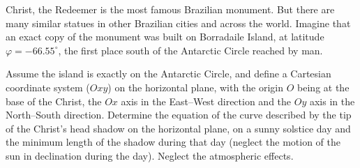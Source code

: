 Christ, the Redeemer is the most famous Brazilian monument. But there are many
similar statues in other Brazilian cities and across the world. Imagine that
an exact copy of the monument was built on Borradaile Island, at latitude
$\varphi = -66.55^\circ$, the first place south of the Antarctic Circle
reached by man.

Assume the island is exactly on the Antarctic Circle, and define a Cartesian
coordinate system ($Oxy$) on the horizontal plane, with the origin $O$ being
at the base of the Christ, the $Ox$ axis in the East--West direction and the
$Oy$ axis in the North--South direction. Determine the equation of the curve
described by the tip of the Christ's head shadow on the horizontal plane, on a
sunny solstice day and the minimum length of the shadow during that day
(neglect the motion of the sun in declination during the day). Neglect the
atmospheric effects.

